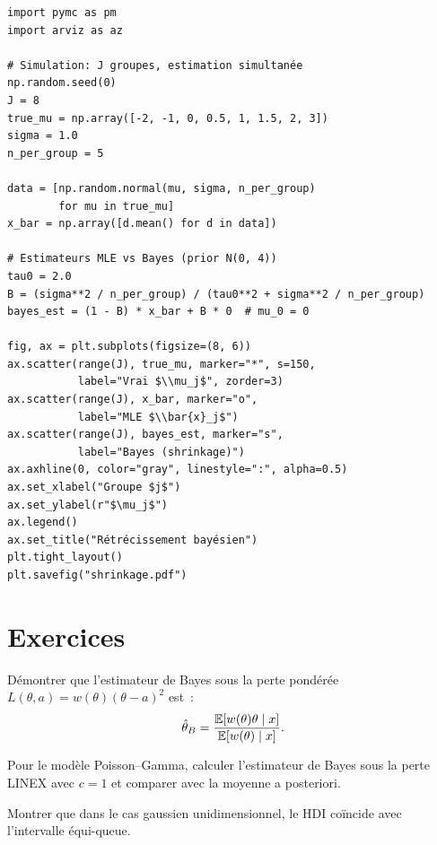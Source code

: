 \begin{codeblock}[title=\textbf{Effet de r\'etr\'ecissement bay\'esien}]
\begin{verbatim}
import pymc as pm
import arviz as az

# Simulation: J groupes, estimation simultanée
np.random.seed(0)
J = 8
true_mu = np.array([-2, -1, 0, 0.5, 1, 1.5, 2, 3])
sigma = 1.0
n_per_group = 5

data = [np.random.normal(mu, sigma, n_per_group)
        for mu in true_mu]
x_bar = np.array([d.mean() for d in data])

# Estimateurs MLE vs Bayes (prior N(0, 4))
tau0 = 2.0
B = (sigma**2 / n_per_group) / (tau0**2 + sigma**2 / n_per_group)
bayes_est = (1 - B) * x_bar + B * 0  # mu_0 = 0

fig, ax = plt.subplots(figsize=(8, 6))
ax.scatter(range(J), true_mu, marker="*", s=150,
           label="Vrai $\\mu_j$", zorder=3)
ax.scatter(range(J), x_bar, marker="o",
           label="MLE $\\bar{x}_j$")
ax.scatter(range(J), bayes_est, marker="s",
           label="Bayes (shrinkage)")
ax.axhline(0, color="gray", linestyle=":", alpha=0.5)
ax.set_xlabel("Groupe $j$")
ax.set_ylabel(r"$\mu_j$")
ax.legend()
ax.set_title("Rétrécissement bayésien")
plt.tight_layout()
plt.savefig("shrinkage.pdf")
\end{verbatim}
\end{codeblock}

\section{Exercices}

\begin{exercice}
D\'emontrer que l'estimateur de Bayes sous la perte pond\'er\'ee
$L(\theta, a) = w(\theta)(\theta - a)^2$ est~:
\[
  \hat{\theta}_B = \frac{\mathbb{E}[w(\theta)\theta \mid x]}{\mathbb{E}[w(\theta) \mid x]}.
\]
\end{exercice}

\begin{exercice}
Pour le mod\`ele Poisson--Gamma, calculer l'estimateur de Bayes sous
la perte LINEX avec $c = 1$ et comparer avec la moyenne a posteriori.
\end{exercice}

\begin{exercice}
Montrer que dans le cas gaussien unidimensionnel, le HDI co\"incide
avec l'intervalle \'equi-queue.
\end{exercice}

